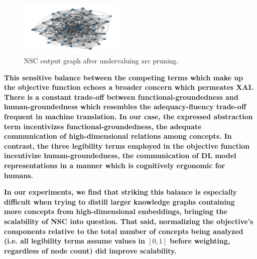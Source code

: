 \begin{figure}[h]
\centering
\includegraphics[width=0.45\textwidth]{img/short_run.png}
\caption{NSC output graph after undervaluing arc pruning.}\label{fig:pruning}
\end{figure}

\textbf{This sensitive balance between the competing terms which make up the objective function echoes a broader concern which permeates XAI. There is a constant trade-off between functional-groundedness and human-groundedness which resembles the adequacy-fluency trade-off frequent in machine translation. In our case, the expressed abstraction term incentivizes functional-groundedness, the adequate communication of high-dimensional relations among concepts. In contrast, the three legibility terms employed in the objective function incentivize human-groundedness, the communication of DL model representations in a manner which is cognitively ergonomic for humans. 
}

\textbf{In our experiments, we find that striking this balance is especially difficult when trying to distill larger knowledge graphs containing more concepts from high-dimensional embeddings, bringing the scalability of NSC into question. That said, normalizing the objective's components relative to the total number of concepts being analyzed (i.e. all legibility terms assume values in $[0, 1]$ before weighting, regardless of node count) did improve scalability.}
